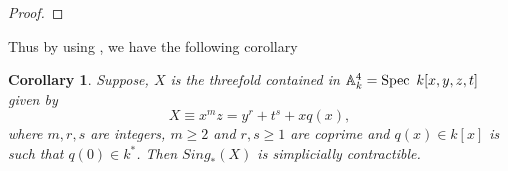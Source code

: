 \documentclass[11pt, reqno]{amsart}
\theoremstyle{plain}
\newtheorem{corollary}[thm]{Corollary}
\theoremstyle{definition}
\newcommand{\Spec}{{\rm Spec \,}}
\newcommand{\A}{{\mathbb A}}
\begin{document}
\begin{proof}
%
%
%
%
%
%
%
%
%
%
\end{proof}
Thus by using \cite[Lemma 4.1]{df}, we have the following corollary
\begin{corollary}
    Suppose, $X$ is the threefold contained in $\mathbb{A}^4_k = \Spec\ k[x,y,z,t]$ given by
    $$X \equiv x^mz = y^r+t^s+xq(x),$$
    where $m,r,s$ are integers, $m \geq 2$ and $r,s \geq 1$ are coprime and $q(x) \in k[x]$ is such that $q(0) \in k^*$. Then $Sing_*(X)$ is simplicially contractible.
\end{corollary}
	
	



   


\end{document}
